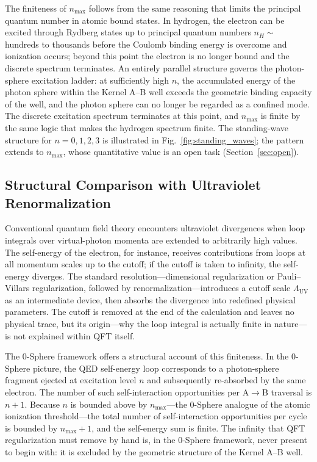 \documentclass[%
 reprint, amsmath,amssymb, aps, prb, ]{revtex4-2}
\numberwithin{equation}{section}
\begin{document}
The finiteness of $n_{\max}$ follows from the same reasoning that limits the principal quantum number in atomic bound states. In hydrogen, the electron can be excited through Rydberg states up to principal quantum numbers $n_H \sim$ hundreds to thousands before the Coulomb binding energy is overcome and ionization occurs; beyond this point the electron is no longer bound and the discrete spectrum terminates. An entirely parallel structure governs the photon-sphere excitation ladder: at sufficiently high $n$, the accumulated energy of the photon sphere within the Kernel A--B well exceeds the geometric binding capacity of the well, and the photon sphere can no longer be regarded as a confined mode. The discrete excitation spectrum terminates at this point, and $n_{\max}$ is finite by the same logic that makes the hydrogen spectrum finite. The standing-wave structure for $n = 0,1,2,3$ is illustrated in Fig.~\ref{fig:standing_waves}; the pattern extends to $n_{\max}$, whose quantitative value is an open task (Section~\ref{sec:open}).

\subsection{Structural Comparison with Ultraviolet Renormalization}
\label{sec:cutoff_renorm}

Conventional quantum field theory encounters ultraviolet divergences when loop integrals over virtual-photon momenta are extended to arbitrarily high values. The self-energy of the electron, for instance, receives contributions from loops at all momentum scales up to the cutoff; if the cutoff is taken to infinity, the self-energy diverges. The standard resolution---dimensional regularization or Pauli--Villars regularization, followed by renormalization---introduces a cutoff scale $\Lambda_{\text{UV}}$ as an intermediate device, then absorbs the divergence into redefined physical parameters. The cutoff is removed at the end of the calculation and leaves no physical trace, but its origin---why the loop integral is actually finite in nature---is not explained within QFT itself.

The 0-Sphere framework offers a structural account of this finiteness. In the 0-Sphere picture, the QED self-energy loop corresponds to a photon-sphere fragment ejected at excitation level $n$ and subsequently re-absorbed by the same electron. The number of such self-interaction opportunities per A$\to$B traversal is $n+1$. Because $n$ is bounded above by $n_{\max}$---the 0-Sphere analogue of the atomic ionization threshold---the total number of self-interaction opportunities per cycle is bounded by $n_{\max} + 1$, and the self-energy sum is finite. The infinity that QFT regularization must remove by hand is, in the 0-Sphere framework, never present to begin with: it is excluded by the geometric structure of the Kernel A--B well.
\end{document}
